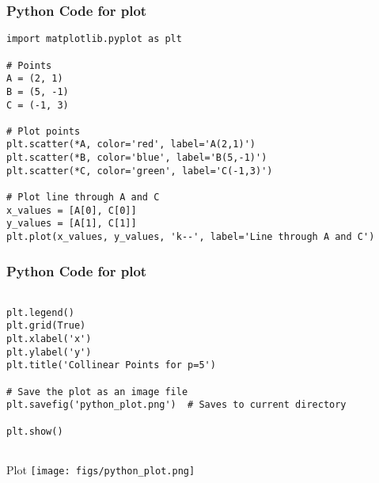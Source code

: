 \documentclass{beamer}
\begin{document}
\begin{frame}[fragile]
    \frametitle{Python Code for plot}
    \begin{lstlisting}
import matplotlib.pyplot as plt

# Points
A = (2, 1)
B = (5, -1)
C = (-1, 3)

# Plot points
plt.scatter(*A, color='red', label='A(2,1)')
plt.scatter(*B, color='blue', label='B(5,-1)')
plt.scatter(*C, color='green', label='C(-1,3)')

# Plot line through A and C
x_values = [A[0], C[0]]
y_values = [A[1], C[1]]
plt.plot(x_values, y_values, 'k--', label='Line through A and C')

    \end{lstlisting}
\end{frame}

\begin{frame}[fragile]
    \frametitle{Python Code for plot}
    \begin{lstlisting}

plt.legend()
plt.grid(True)
plt.xlabel('x')
plt.ylabel('y')
plt.title('Collinear Points for p=5')

# Save the plot as an image file
plt.savefig('python_plot.png')  # Saves to current directory

plt.show()


    \end{lstlisting}
\end{frame}




\begin{frame}{Plot}
    \centering
    \texttt{[image: figs/python\_plot.png]}     
\end{frame}
\end{document}
